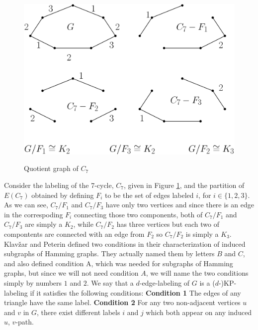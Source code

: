 \documentclass[12pt,a4paper,titlepage,openany]{report}
\begin{document}
\begin{figure}[h!]
\begin{center}
\includegraphics[width=0.8\linewidth]{figures/quotientgraph.png}\label{quotientgraphc7}
\end{center}
\caption{Quotient graph of $C_7$}
\end{figure}
Consider the labeling of the 7-cycle, $C_7$, given in Figure \ref{quotientgraphc7}, and the partition of $E(C_7)$ obtained by defining $F_i$ to be the set of edges labeled $i$, for $i\in \{1,2,3\}$. As we can see, $C_7/ F_1$ and $C_7/F_3$ have only two vertices and since there is an edge in the correspoding $F_i$ connecting those two components, both of  $C_7/ F_1$ and $C_7/F_3$ are simply a $K_2$, while $C_7/ F_2$ has three vertices but each two of compontents are connected with an edge from $F_2$ so $C_7/ F_2$ is simply a $K_3$.   
\newline
Klav\v zar and Peterin defined two conditions in their characterization of induced subgraphs of Hamming graphs. They actually named them by letters $B$ and $C$, and also defined condition A, which was needed for subgraphs of Hamming graphs, but since we will not need condition $A$, we will name the two conditions simply by numbers $1$ and $2$.\newline
We say that a $d$-edge-labeling of $G$ is a ($d$-)KP-labeling if it satisfies the following conditions:
\newline
\textbf{Condition 1} The edges of any triangle have the same label.\newline
\textbf{Condition 2} For any two non-adjacent vertices $u$ and $v$ in $G$, there exist different labels $i$ and $j$ which both appear on any induced $u$, $v$-path.\newline
\end{document}
